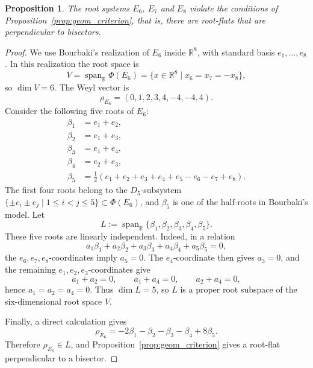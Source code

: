 \documentclass[11pt]{amsart}
\DeclareMathOperator{\Span}{span}
\theoremstyle{plain}
\newtheorem{prop}[thm]{Proposition}
\theoremstyle{definition}
\theoremstyle{remark}
\begin{document}
	\begin{prop}
		\label{prop:E678}
		The root systems  \(E_6\), \(E_7\) and \(E_8\) violate the conditions of
		Proposition~\ref{prop:geom_criterion}, that is, there are root-flats that are perpendicular to bisectors.
	\end{prop}
	
	\begin{proof}
		We use Bourbaki's realization of \(E_6\) inside \(\mathbb R^8\), with standard basis \(e_1,\ldots,e_8\).  In this realization the root space is
		\[
		V=\Span_{\mathbb R}\Phi(E_6)
		=
		\{x\in\mathbb R^8 \mid x_6=x_7=-x_8\},
		\]
		so \(\dim V=6\).  The Weyl vector is
		\[
		\rho_{E_6}=(0,1,2,3,4,-4,-4,4).
		\]
		Consider the following five roots of \(E_6\):
		\[
		\begin{aligned}
			\beta_1&=e_1+e_2,\\
			\beta_2&=e_1+e_3,\\
			\beta_3&=e_1+e_4,\\
			\beta_4&=e_2+e_3,\\
			\beta_5&=\frac12(e_1+e_2+e_3+e_4+e_5-e_6-e_7+e_8).
		\end{aligned}
		\]
		The first four roots belong to the \(D_5\)-subsystem \(\{\pm e_i\pm e_j\mid 1\le i<j\le5\}\subset\Phi(E_6)\), and \(\beta_5\) is one of the half-roots in Bourbaki's model.  Let
		\[
		L:=\Span_{\mathbb R}\{\beta_1,\beta_2,\beta_3,\beta_4,\beta_5\}.
		\]
		These five roots are linearly independent.  Indeed, in a relation
		\[
		a_1\beta_1+a_2\beta_2+a_3\beta_3+a_4\beta_4+a_5\beta_5=0,
		\]
		the \(e_6,e_7,e_8\)-coordinates imply \(a_5=0\).  The \(e_4\)-coordinate then gives \(a_3=0\), and the remaining \(e_1,e_2,e_3\)-coordinates give
		\[
		a_1+a_2=0,
		\qquad
		a_1+a_4=0,
		\qquad
		a_2+a_4=0,
		\]
		hence \(a_1=a_2=a_4=0\).  Thus \(\dim L=5\), so \(L\) is a proper root subspace of the six-dimensional root space \(V\).
		
		Finally, a direct calculation gives
		\[
		\rho_{E_6}
		=
		-2\beta_1-\beta_2-\beta_3-\beta_4+8\beta_5.
		\]
		Therefore \(\rho_{E_6}\in L\), and Proposition~\ref{prop:geom_criterion} gives a root-flat perpendicular to a bisector.
		

\end{proof}
\end{document}
